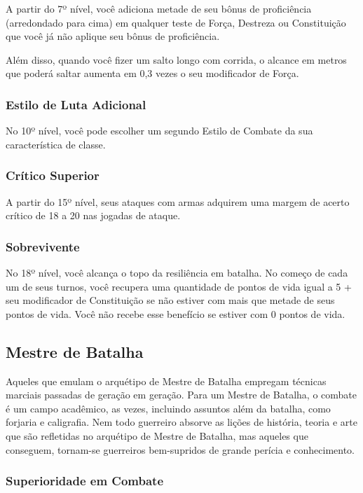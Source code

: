 \documentclass{RPG_Adventure}[2021/10/20]
\begin{document}
\begin{multicols}{2}
A partir do 7º nível, você adiciona metade de seu bônus de proficiência
(arredondado para cima) em qualquer teste de Força, Destreza ou Constituição que
você já não aplique seu bônus de proficiência.

Além disso, quando você fizer um salto longo com corrida, o alcance em metros
que poderá saltar aumenta em 0,3 vezes o seu modificador de Força.

\subsubsection{Estilo de Luta Adicional}%

No 10º nível, você pode escolher um segundo Estilo de Combate da sua
característica de classe.

\subsubsection{Crítico Superior}%

A partir do 15º nível, seus ataques com armas adquirem uma margem de acerto
crítico de 18 a 20 nas jogadas de ataque.

\subsubsection{Sobrevivente}%

No 18º nível, você alcança o topo da resiliência em batalha. No começo de cada
um de seus turnos, você recupera uma quantidade de pontos de vida igual a 5 +
seu modificador de Constituição se não estiver com mais que metade de seus
pontos de vida. Você não recebe esse benefício se estiver com 0 pontos de vida.

\subsection*{Mestre de Batalha}%

Aqueles que emulam o arquétipo de Mestre de Batalha empregam técnicas marciais
passadas de geração em geração. Para um Mestre de Batalha, o combate é um campo
acadêmico, as vezes, incluindo assuntos além da batalha, como forjaria e
caligrafia. Nem todo guerreiro absorve as lições de história, teoria e arte que
são refletidas no arquétipo de Mestre de Batalha, mas aqueles que conseguem,
tornam-se guerreiros bem-supridos de grande perícia e conhecimento.

\subsubsection{Superioridade em Combate}%


\end{multicols}
\end{document}
